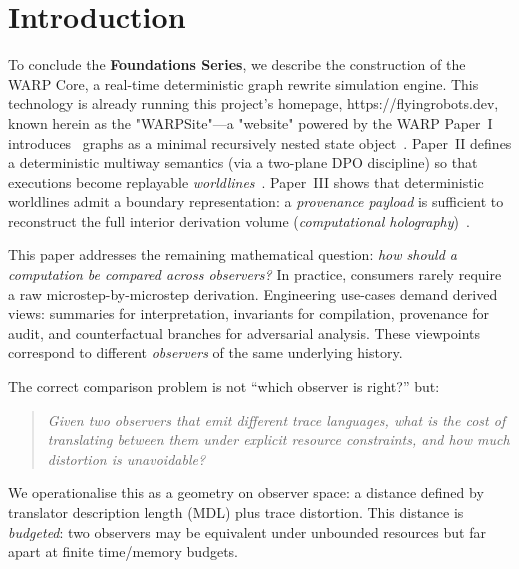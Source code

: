 \documentclass{aion}
\begin{document}

\section{Introduction}
\label{sec:intro}

To conclude the \textbf{\AION{} Foundations Series}, we describe the construction of the WARP Core, a real-time deterministic graph rewrite simulation engine. This technology is already running this project's homepage, https://flyingrobots.dev, known herein as the "WARPSite"---a "website" powered by the WARP
Paper~I introduces \WARP\ graphs as a minimal recursively nested state object~\cite{Ros25a}.
Paper~II defines a deterministic multiway semantics (via a two-plane DPO discipline) so that
executions become replayable \emph{worldlines}~\cite{Ros25b}.
Paper~III shows that deterministic worldlines admit a boundary representation:
a \emph{provenance payload} is sufficient to reconstruct the full interior derivation volume
(\emph{computational holography})~\cite{Ros25c}.

This paper addresses the remaining mathematical question: \emph{how should a computation be compared across observers?}
In practice, consumers rarely require a raw microstep-by-microstep derivation. Engineering use-cases demand derived views:
summaries for interpretation, invariants for compilation, provenance for audit, and counterfactual branches for adversarial analysis.
These viewpoints correspond to different \emph{observers} of the same underlying history.

The correct comparison problem is not ``which observer is right?'' but:
\begin{quote}
\emph{Given two observers that emit different trace languages, what is the cost of translating between them
under explicit resource constraints, and how much distortion is unavoidable?}
\end{quote}
We operationalise this as a geometry on observer space: a distance defined by translator description length
(MDL) plus trace distortion. This distance is \emph{budgeted}: two observers may be equivalent under unbounded
resources but far apart at finite time/memory budgets.
\end{document}
